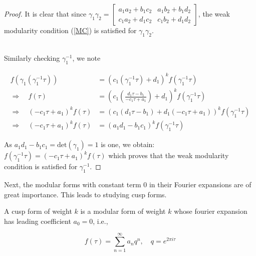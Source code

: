 \begin{proposition}
\begin{proof}
It is clear that since $\gamma_{1} \gamma_{2}= \left[\begin{array}{ll}a_{1}a_{2}+b_{1}c_{2} & a_{1}b_{2}+b_{1}d_{2} \\ c_{1}a_{2}+d_{1}c_{2} & 
c_{1}b_{2}+d_{1}d_{2}\end{array}\right]$, the weak modularity condition (\ref{MC}) is satisfied for $\gamma_{1} \gamma_{2}$. 

\\ Similarly checking $\gamma_{1}^{-1}$, we note

$$
\begin{aligned}
f\left(\gamma_{1}\left(\gamma_{1}^{-1} \tau\right)\right) & =\left(c_{1}\left(\gamma_{1}^{-1} \tau\right)+d_{1}\right)^{k} f\left(\gamma_{1}^{-1} \tau\right) \\
\Rightarrow \quad f(\tau) & =\left(c_{1}\left(\frac{d_{1} \tau-b_{1}}{-c_{1} \tau+a_{1}}\right)+d_{1}\right)^{k} f\left(\gamma_{1}^{-1} \tau\right) \\
\Longrightarrow \quad\left(-c_{1} \tau+a_{1}\right)^{k} f(\tau) & =\left(c_{1}\left(d_{1} \tau-b_{1}\right)+d_{1}\left(-c_{1} \tau+a_{1}\right)\right)^{k} f\left(\gamma_{1}^{-1} \tau\right) \\
\Longrightarrow \quad\left(-c_{1} \tau+a_{1}\right)^{k} f(\tau) & =\left(a_{1} d_{1}-b_{1} c_{1}\right)^{k} f\left(\gamma_{1}^{-1} \tau\right)
\end{aligned}
$$

As $a_{1} d_{1}-b_{1} c_{1}=\text{det}(\gamma_{1})=1$ is one, we obtain: $f\left(\gamma_{1}^{-1} \tau\right)=\left(-c_{1} \tau+a_{1}\right)^{k} f(\tau)$ which proves that the weak modularity condition is satisfied for $\gamma_{1}^{-1}$.

\end{proof}
\end{proposition}

Next, the modular forms with constant term 0 in their Fourier expansions are of great importance. This leads to studying cusp forms.
\begin{definition}
  A cusp form of weight $k$ is a modular form of weight $k$ whose fourier expansion has leading coefficient $a_{0}=0$, i.e.,

$$
f(\tau)=\sum_{n=1}^{\infty} a_{n} q^{n}, \quad q=e^{2 \pi i \tau}
$$
  \end{definition}
